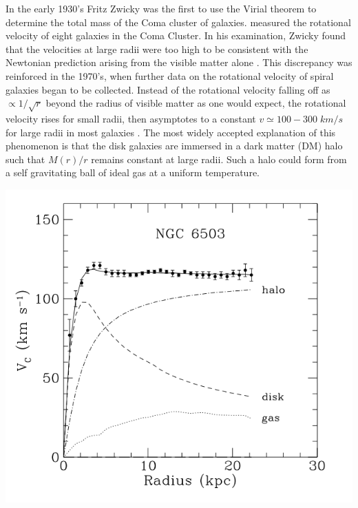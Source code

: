 \documentclass[a4paper,12pt]{article}
\begin{document}
In the early 1930's Fritz Zwicky was the first to use the Virial theorem to determine the total mass of the Coma cluster of galaxies.   measured the rotational velocity of eight galaxies in the Coma Cluster. In his examination, Zwicky found that the velocities at large radii were too high to be consistent with the Newtonian prediction arising from the visible matter alone \cite{Zwicky}. This discrepancy was reinforced in the 1970's, when further data on the rotational velocity of spiral galaxies began to be collected.  Instead of the rotational velocity falling off as $\propto 1/\sqrt{r}$ beyond the radius of visible matter as one would expect, the rotational velocity rises for small radii, then asymptotes to a constant $ v \simeq 100-300 \; km/s $ for large radii in most galaxies \cite{Persic,Battaner,Binney}.  The most widely accepted explanation of this phenomenon is that the disk galaxies are immersed in a dark matter (DM) halo such that $ M(r)/r $ remains constant at large radii.  Such a halo could form from a self gravitating ball of ideal gas at a uniform temperature.

\begin{center}
\includegraphics[scale=.7]{RotationCurve2.png}
\end{center}
\end{document}
